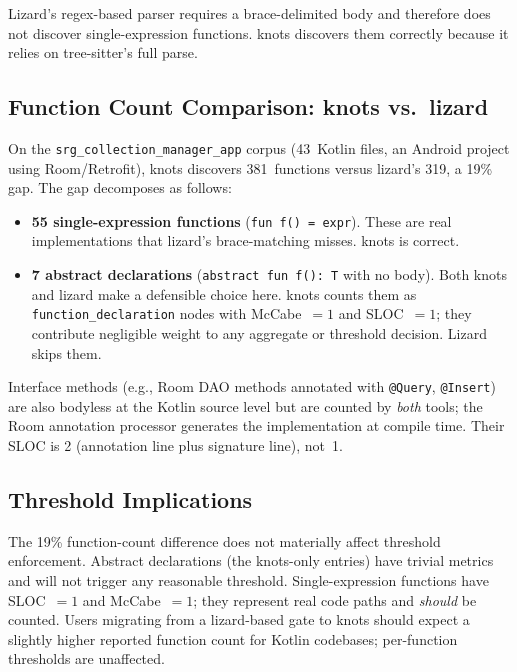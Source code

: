 \documentclass[10pt,twocolumn,letterpaper]{article}
\begin{document}
Lizard's regex-based parser requires a brace-delimited body and therefore
does not discover single-expression functions.  knots discovers them
correctly because it relies on tree-sitter's full parse.

\subsection{Function Count Comparison: knots vs.\ lizard}

On the \texttt{srg\_collection\_manager\_app} corpus (43~Kotlin files,
an Android project using Room/Retrofit), knots discovers 381~functions versus
lizard's 319, a 19\% gap.  The gap decomposes as follows:

\begin{itemize}
  \item \textbf{55 single-expression functions} (\texttt{fun f() = expr}).
    These are real implementations that lizard's brace-matching misses.
    knots is correct.
  \item \textbf{7 abstract declarations} (\texttt{abstract fun f(): T} with
    no body).  Both knots and lizard make a defensible choice here.  knots
    counts them as \texttt{function\_declaration} nodes with
    McCabe~$= 1$ and SLOC~$= 1$; they contribute negligible weight to any
    aggregate or threshold decision.  Lizard skips them.
\end{itemize}

Interface methods (e.g., Room DAO methods annotated with \texttt{@Query},
\texttt{@Insert}) are also bodyless at the Kotlin source level but are
counted by \emph{both} tools; the Room annotation processor generates the
implementation at compile time.  Their SLOC is 2 (annotation line plus
signature line), not~1.

\subsection{Threshold Implications}

The 19\% function-count difference does not materially affect threshold
enforcement.  Abstract declarations (the knots-only entries) have trivial
metrics and will not trigger any reasonable threshold.
Single-expression functions have SLOC~$= 1$ and McCabe~$= 1$; they represent
real code paths and \emph{should} be counted.  Users migrating from a
lizard-based gate to knots should expect a slightly higher reported function
count for Kotlin codebases; per-function thresholds are unaffected.
\end{document}
